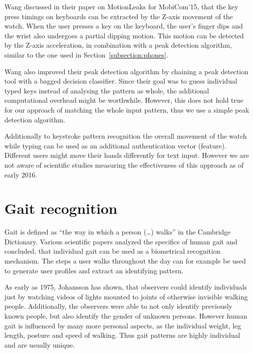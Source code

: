 Wang \etal\cite{wang2015mole} discussed in their paper on MotionLeaks for MobiCom'15, that the key press timings on keyboards can be extracted by the Z-axis movement of the watch. When the user presses a key on the keyboard, the user's finger dips and the wrist also undergoes a partial dipping motion. This motion can be detected by the Z-axis acceleration, in combination with a peak detection algorithm, similar to the one used in Section~\ref{subsection:phones}.

Wang \etal also improved their peak detection algorithm by chaining a peak detection tool with a bagged decision classifier. Since their goal was to guess individual typed keys instead of analysing the pattern as whole, the additional computational overhead might be worthwhile. However, this does not hold true for our approach of matching the whole  input pattern, thus we use a simple peak detection algorithm.

Additionally to keystroke pattern recognition the overall movement of the watch while typing can be used as an additional authentication vector (\ie feature). Different users might move their hands differently for text input. However we are not aware of scientific studies measuring the effectiveness of this approach as of early 2016.

\section{Gait recognition}
Gait is defined as ``the way in which a person (\ldots) walks'' in the Cambridge Dictionary. Various scientific papers analyzed the specifics of human gait \cite{johansson1975visual, lee2002gait, johnstonsmartwatch} and concluded, that individual gait can be used as a biometrical recognition mechanism. The steps a user walks throughout the day can for example be used to generate user profiles and extract an identifying pattern. 

As early as 1975, Johansson \cite{johansson1975visual} has shown, that observers could identify individuals just by watching videos of lights mounted to joints of otherwise invisible walking people. Additionally, the observers were able to not only identify previously known people, but also identify the gender of unknown persons. However human gait is influenced by many more personal aspects, as the individual weight, leg length, posture and speed of walking. Thus gait patterns are highly individual and are usually unique.

